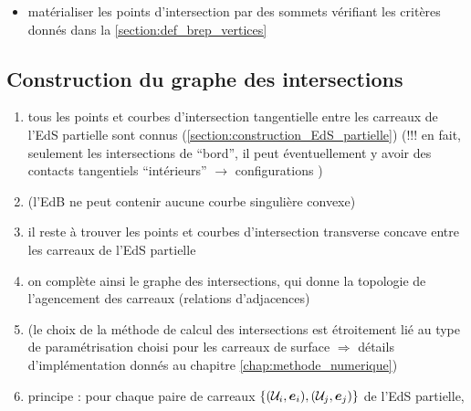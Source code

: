 \begin{enumerate}
\begin{itemize}
		\item matérialiser les points d'intersection par des sommets vérifiant les critères donnés dans la \autoref{section:def_brep_vertices}
	\end{itemize}
\end{enumerate}

\subsection{Construction du graphe des intersections}
\begin{enumerate}
	\item tous les points et courbes d'intersection tangentielle entre les carreaux de l'EdS partielle sont connus (\cf \autoref{section:construction_EdS_partielle}) (!!! en fait, seulement les intersections de ``bord'', il peut éventuellement y avoir des contacts tangentiels ``intérieurs'' $\to$ configurations )
	\item (l'EdB ne peut contenir aucune courbe singulière convexe)
	\item il reste à trouver les points et courbes d'intersection transverse concave entre les carreaux de l'EdS partielle
	\item on complète ainsi le graphe des intersections, qui donne la topologie de l'agencement des carreaux (relations d'adjacences)
	\item (le choix de la méthode de calcul des intersections est étroitement lié au type de paramétrisation choisi pour les carreaux de surface $\Rightarrow$ détails d'implémentation donnés au chapitre \autoref{chap:methode_numerique})
	\item principe : pour chaque paire de carreaux $\left\{ (\mathcal{U}_i, \bm{e}_i), (\mathcal{U}_j, \bm{e}_j) \right\}$ de l'EdS partielle,

\end{enumerate}
